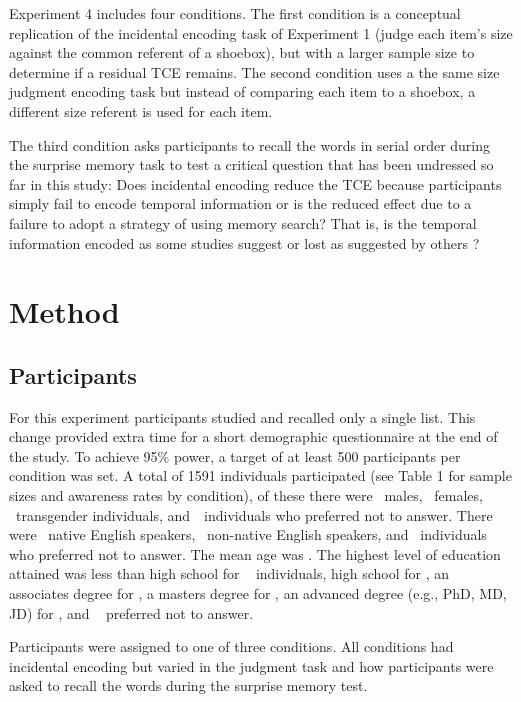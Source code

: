 \documentclass[man,natbib,floatsintext]{apa6} %
\begin{document}
Experiment 4 includes four conditions. The first condition is a conceptual replication of the incidental encoding task of Experiment 1 (judge each item's size against the common referent of a shoebox), but with a larger sample size to determine if a residual TCE remains. The second condition uses a the same size judgment encoding task but instead of comparing each item to a shoebox, a different size referent is used for each item.

The third condition asks participants to recall the words in serial order during the surprise memory task to test a critical question that has been undressed so far in this study: Does incidental encoding reduce the TCE because participants simply fail to encode temporal information or is the reduced effect due to a failure to adopt a strategy of using memory search? That is, is the temporal information encoded as some studies suggest \citep{Nair} or lost as suggested by others \cite{glen,hint}?   


\section{Method}
\label{TODO-8}
\subsection{Participants}
For this experiment participants studied and recalled only a single list. This change provided extra time for a short demographic questionnaire at the end of the study. To achieve 95\% power, a target of at least 500 participants per condition was set. A total of 1591 individuals participated (see Table 1 for sample sizes and awareness rates by condition), of these there were \males~males, \females~females, \others~transgender individuals, and~\notans~individuals who preferred not to answer. There were \engY~native English speakers, \engN~non-native English speakers, and \engS~individuals who preferred not to answer.  The mean age was \age. The highest level of education attained was less than high school for \noed~ individuals, high school for \hschool, an associates degree for \ass, a masters degree for \mas, an advanced degree (e.g., PhD, MD, JD) for \phd, and \notansed~ preferred not to answer.

Participants were assigned to one of three conditions. All conditions had incidental encoding but varied in the judgment task and how participants were asked to recall the words during the surprise memory test.
\end{document}
